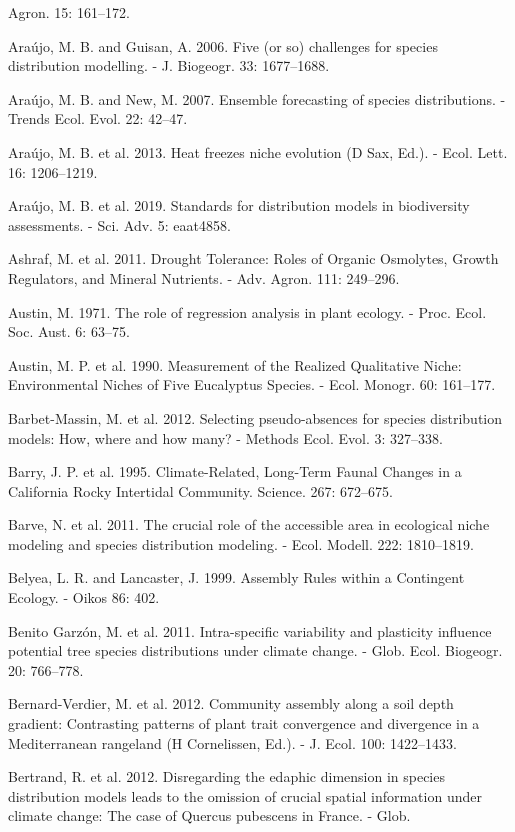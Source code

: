 \documentclass[11pt,twoside]{reedthesis}
\begin{document}
Agron. 15: 161--172.\par
Araújo, M. B. and Guisan, A. 2006. Five (or so) challenges for species
distribution modelling. - J. Biogeogr. 33: 1677--1688.\par
Araújo, M. B. and New, M. 2007. Ensemble forecasting of species
distributions. - Trends Ecol. Evol. 22: 42--47.\par
Araújo, M. B. et al. 2013. Heat freezes niche evolution (D Sax, Ed.). -
Ecol. Lett. 16: 1206--1219.\par
Araújo, M. B. et al. 2019. Standards for distribution models in
biodiversity assessments. - Sci. Adv. 5: eaat4858.\par
Ashraf, M. et al. 2011. Drought Tolerance: Roles of Organic Osmolytes,
Growth Regulators, and Mineral Nutrients. - Adv. Agron. 111:
249--296.\par
Austin, M. 1971. The role of regression analysis in plant ecology. -
Proc. Ecol. Soc. Aust. 6: 63--75.\par
Austin, M. P. et al. 1990. Measurement of the Realized Qualitative
Niche: Environmental Niches of Five Eucalyptus Species. - Ecol. Monogr.
60: 161--177.\par
Barbet-Massin, M. et al. 2012. Selecting pseudo-absences for species
distribution models: How, where and how many? - Methods Ecol. Evol. 3:
327--338.\par
Barry, J. P. et al. 1995. Climate-Related, Long-Term Faunal Changes in a
California Rocky Intertidal Community. Science. 267: 672--675.\par
Barve, N. et al. 2011. The crucial role of the accessible area in
ecological niche modeling and species distribution modeling. - Ecol.
Modell. 222: 1810--1819.\par
Belyea, L. R. and Lancaster, J. 1999. Assembly Rules within a Contingent
Ecology. - Oikos 86: 402.\par
Benito Garzón, M. et al. 2011. Intra-specific variability and plasticity
influence potential tree species distributions under climate change. -
Glob. Ecol. Biogeogr. 20: 766--778.\par
Bernard-Verdier, M. et al. 2012. Community assembly along a soil depth
gradient: Contrasting patterns of plant trait convergence and divergence
in a Mediterranean rangeland (H Cornelissen, Ed.). - J. Ecol. 100:
1422--1433.\par
Bertrand, R. et al. 2012. Disregarding the edaphic dimension in species
distribution models leads to the omission of crucial spatial information
under climate change: The case of Quercus pubescens in France. - Glob.
\end{document}
